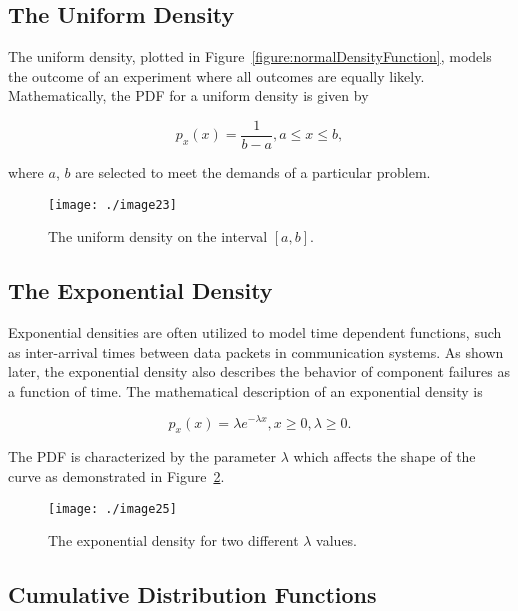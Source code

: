{\subsection*{The Uniform Density}
\label{subsection:the-uniform-density}


The uniform density, plotted in 
Figure~\ref{figure:normalDensityFunction}, models the outcome of an
experiment where all outcomes are equally likely. Mathematically, the
PDF for a uniform density is given by

\begin{equation}
\label{equ:uniformDensity}
p_x(x) = \frac{1}{b-a}, a \leq x \leq b,
\end{equation}

where $a$, $b$ are selected to meet the demands of a particular problem.


\begin{figure}[h]
\centering
\texttt{[image: ./image23]}
\caption{The uniform density on the interval $[ a,b ]$.}
\label{figure:uniformDensityFunction}
\end{figure}


\subsection*{The Exponential Density}
\label{subsection:the-exponential-density}


Exponential densities are often utilized to model time dependent
functions, such as inter-arrival times between data packets in
communication systems. As shown later, the exponential density also
describes the behavior of component failures as a function of time. The
mathematical description of an exponential density is

\begin{equation}
\label{equ:exponentialDensity}
p_x(x) = \lambda e^{-\lambda x} , x \geq 0, \lambda \geq 0.
\end{equation}

The PDF is characterized by the parameter $\lambda$ which affects the
shape of the curve as demonstrated in 
Figure~\ref{figure:exponentialDensityFunction}.


\begin{figure}[h]
\centering
\texttt{[image: ./image25]}
\caption{The exponential density for two different $\lambda$ values.}
\label{figure:exponentialDensityFunction}
\end{figure}


\subsection{Cumulative Distribution Functions}
\label{cumulative-distribution-functions}

}
